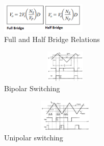 \documentclass[twocolumn]{article}
\begin{document}
\begin{figure}[!ht]
	\includegraphics[width=1.6in,height=.6in]{fullandhalfinout.png}
	\caption{Full and Half Bridge Relations}
\end{figure}

\begin{figure}[!ht]
	\includegraphics[width=2.5in,height=0.6in]{bipolar1.png}
	\caption{Bipolar Switching}
\end{figure}

\begin{figure}[!ht]
	\includegraphics[width=2.5in,height=0.6in]{unipolar1.png}
	\caption{Unipolar switching}
\end{figure}





\end{document}
